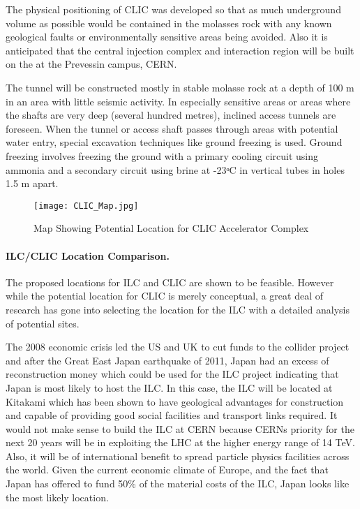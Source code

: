The physical positioning of CLIC was developed so that as much underground volume as possible would be contained in the molasses rock with any known geological faults or environmentally sensitive areas being avoided. Also it is anticipated that the central injection complex and interaction region will be built on the at the Prevessin campus, CERN.

The tunnel will be constructed mostly in stable molasse rock at a depth of 100  m in an area with little seismic activity. In especially sensitive areas or areas where the shafts are very deep (several hundred metres), inclined access tunnels are foreseen. When the tunnel or access shaft passes through areas with potential water entry, special excavation techniques like ground freezing is used. Ground freezing involves freezing the ground with a primary cooling circuit using ammonia and a secondary circuit using brine at -23ᵒC in vertical tubes in holes 1.5 m apart.

\begin{figure}[!htb]
\centering
\texttt{[image: CLIC\_Map.jpg]}
\caption{Map Showing Potential Location for CLIC Accelerator Complex \cite{CLIC:Concept}}
\end{figure}

\paragraph{ILC/CLIC Location Comparison.}

The proposed locations for ILC and CLIC are shown to be feasible. However while the potential location for CLIC is merely conceptual, a great deal of research has gone into selecting the location for the ILC with a detailed analysis of potential sites.

The 2008 economic crisis led the US and UK to cut funds to the collider project and after the Great East Japan earthquake of 2011, Japan had an excess of reconstruction money which could be used for the ILC project indicating that Japan is most likely to host the ILC. In this case, the ILC will be located at Kitakami which has been shown to have geological advantages for construction and capable of providing good social facilities and transport links required. It would not make sense to build the ILC at CERN because CERNs priority for the next 20 years will be in exploiting the LHC at the higher energy range of 14 TeV. Also, it will be of international benefit to spread particle physics facilities across the world. Given the current economic climate of Europe, and the fact that Japan has offered to fund 50\% of the material costs of the ILC, Japan looks like the most likely location.
 
